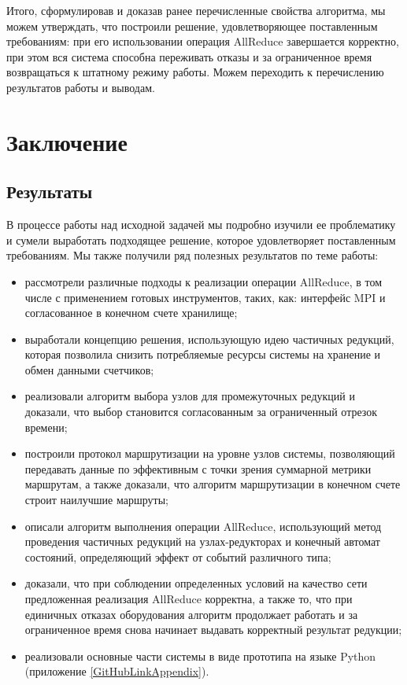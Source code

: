 \documentclass{article}
\theoremstyle{plain}
\theoremstyle{plain}
\theoremstyle{plain}
\theoremstyle{plain}
\theoremstyle{definition}
\theoremstyle{remark}
\theoremstyle{plain}
\begin{document}
Итого, сформулировав и доказав ранее перечисленные свойства алгоритма, мы можем утверждать, что построили решение, удовлетворяющее поставленным требованиям: при его использовании операция AllReduce завершается корректно, при этом вся система способна переживать отказы и за ограниченное время возвращаться к штатному режиму работы. Можем переходить к перечислению результатов работы и выводам.

\section{Заключение}

\subsection{Результаты}

В процессе работы над исходной задачей мы подробно изучили ее проблематику и сумели выработать подходящее решение, которое удовлетворяет поставленным требованиям. Мы также получили ряд полезных результатов по теме работы:

\begin{itemize}
    \item рассмотрели различные подходы к реализации операции AllReduce, в том числе с применением готовых инструментов, таких, как: интерфейс MPI и согласованное в конечном счете хранилище;
    
    \item выработали концепцию решения, использующую идею частичных редукций, которая позволила снизить потребляемые ресурсы системы на хранение и обмен данными счетчиков;
    
    \item реализовали алгоритм выбора узлов для промежуточных редукций и доказали, что выбор становится согласованным за ограниченный отрезок времени;
    
    \item построили протокол маршрутизации на уровне узлов системы, позволяющий передавать данные по эффективным с точки зрения суммарной метрики маршрутам, а также доказали, что алгоритм маршрутизации в конечном счете строит наилучшие маршруты;
    
    \item описали алгоритм выполнения операции AllReduce, использующий метод проведения частичных редукций на узлах-редукторах и конечный автомат состояний, определяющий эффект от событий различного типа;
    
    \item доказали, что при соблюдении определенных условий на качество сети предложенная реализация AllReduce корректна, а также то, что при единичных отказах оборудования алгоритм продолжает работать и за ограниченное время снова начинает выдавать корректный результат редукции;
    
    \item реализовали основные части системы в виде прототипа на языке Python (приложение \ref{GitHubLinkAppendix}).
\end{itemize}
\end{document}
